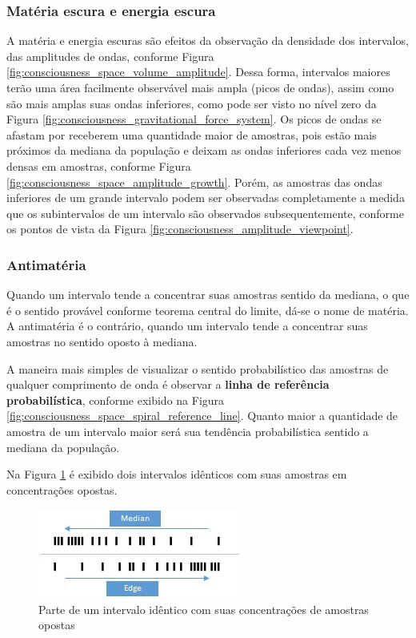 \subsubsection{Matéria escura e energia escura}
A matéria e energia escuras são efeitos da observação da densidade dos intervalos, das amplitudes de ondas, conforme Figura \ref{fig:consciousness_space_volume_amplitude}. Dessa forma, intervalos maiores terão uma área facilmente observável mais ampla (picos de ondas), assim como são mais amplas suas ondas inferiores, como pode ser visto no nível zero da Figura \ref{fig:consciousness_gravitational_force_system}. Os picos de ondas se afastam por receberem uma quantidade maior de amostras, pois estão mais próximos da mediana da população e deixam as ondas inferiores cada vez menos densas em amostras, conforme Figura \ref{fig:consciousness_space_amplitude_growth}. Porém, as amostras das ondas inferiores de um grande intervalo podem ser observadas completamente a medida que os subintervalos de um intervalo são observados subsequentemente, conforme os pontos de vista da Figura \ref{fig:consciousness_amplitude_viewpoint}.

\subsubsection{Antimatéria}
Quando um intervalo tende a concentrar suas amostras sentido da mediana, o que é o sentido provável conforme teorema central do limite, dá-se o nome de matéria. A antimatéria é o contrário, quando um intervalo tende a concentrar suas amostras no sentido oposto à mediana. 

A maneira mais simples de visualizar o sentido probabilístico das amostras de qualquer comprimento de onda é observar a \textbf{linha de referência probabilística}, conforme exibido na Figura \ref{fig:consciousness_space_spiral_reference_line}. Quanto maior a quantidade de amostra de um intervalo maior será sua tendência probabilística sentido a mediana da população.

Na Figura \ref{fig:consciousness_concentration_of_opposite_samples} é exibido dois intervalos idênticos com suas amostras em concentrações opostas.
	\begin{figure}[H]
	\caption{Parte de um intervalo idêntico com suas concentrações de amostras opostas}
	\label{fig:consciousness_concentration_of_opposite_samples}
	\centering
	\includegraphics[scale=1.2]{sections/images/consciousness_concentration_of_opposite_samples.jpg}
	\end{figure}

